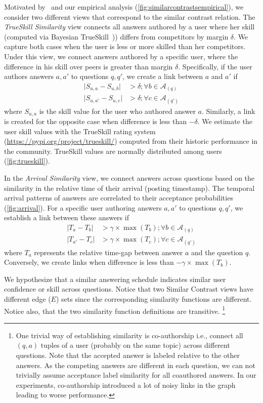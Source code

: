 Motivated by~\cite{Wu2016} and our empirical analysis (\cref{fig:similarcontrastsempirical}), we consider two different views that correspond to the similar contrast relation. The \emph{TrueSkill Similarity} view connects all answers authored by a user where her skill (computed via Bayesian TrueSkill~\cite{TrueSkill06})) differs from competitors by margin $\delta$. We capture both cases when the user is less or more skilled than her competitors. Under this view, we connect answers authored by a specific user, where the difference in his skill over peers is greater than margin $\delta$. Specifically, if the user authors answers $a, a'$ to questions $q, q'$, we create a link between $a$ and $a'$ if
\begin{align}
 \lvert S_{u,a} - S_{u, b} \rvert &> \delta; \forall b \in \mathcal{A}_(q) \\
 \lvert S_{u,a'} - S_{u, c} \rvert &> \delta; \forall c \in \mathcal{A}_(q')
\end{align}
where $S_{u,a}$ is the skill value for the user who authored answer $a$. Similarly, a link is created for the opposite case when difference is less than $-\delta$.
We estimate the user skill values with the TrueSkill rating system (\url{https://pypi.org/project/trueskill/}) computed from their historic performance in the community. TrueSkill values are normally distributed among users (\cref{fig:trueskill}).

In the \emph{Arrival Similarity} view, we connect answers across questions based on the similarity in the relative time of their arrival (posting timestamp).
The temporal arrival patterns of answers are correlated to their acceptance probabilities (\cref{fig:arrival}). For a specific user authoring answers $a, a'$ to questions $q, q'$, we establish a link between these answers if
\begin{align}
 \lvert T_{a} - T_{b} \rvert &> \gamma \times \max(T_{b}); \forall b \in \mathcal{A}_(q) \\
 \lvert T_{a'} - T_{c} \rvert &> \gamma \times \max(T_{c}); \forall c \in \mathcal{A}_(q')
\end{align}
where $T_{a}$ represents the relative time-gap between answer $a$ and the question $q$. Conversely, we create links when difference is less than $-\gamma \times \max(T_{b})$.

We hypothesize that a similar answering schedule indicates similar user confidence or skill across questions.
Notice that two Similar Contrast views have different edge ($E$) sets since the corresponding similarity functions are different. Notice also, that the two similarity function definitions are transitive.
 \footnote{One trivial way of establishing similarity is co-authorship i.e., connect all $(q,a)$ tuples of a user (probably on the same topic) across different questions.
Note that the accepted answer is labeled relative to the other answers. As the competing answers are different in each question, we can not trivially assume acceptance label similarity for all coauthored answers. In our experiments, co-authorship introduced a lot of noisy links in the graph leading to worse performance.}

